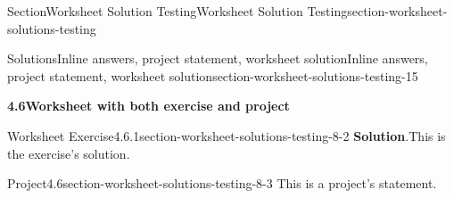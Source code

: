 \documentclass[oneside,10pt,]{article}
\newcommand{\blocktitlefont}{\relax}
\numberwithin{equation}{section}
\begin{document}
\begin{sectionptx}{Section}{Worksheet Solution Testing}{}{Worksheet Solution Testing}{}{}{section-worksheet-solutions-testing}
\begin{solutions-subsection}{Solutions}{Inline answers, project statement, worksheet solution}{}{Inline answers, project statement, worksheet solution}{}{}{section-worksheet-solutions-testing-15}
\par\medskip
\noindent\textbf{\normalsize{}4.6\space\textperiodcentered\space{}Worksheet with both exercise and project}
\begin{divisionsolution}{Worksheet Exercise}{4.6.1}{}{section-worksheet-solutions-testing-8-2}%
\noindent\textbf{\blocktitlefont Solution}.\hypertarget{section-worksheet-solutions-testing-8-2-3-main}{}\quad{}This is the exercise's solution.%
\end{divisionsolution}%
\begin{projectsolution}{Project}{4.6}{}{section-worksheet-solutions-testing-8-3}%
This is a project's statement.%
\end{projectsolution}%
\end{solutions-subsection}
\end{sectionptx}
%
%
\typeout{************************************************}
\typeout{************************************************}
%
\end{document}
